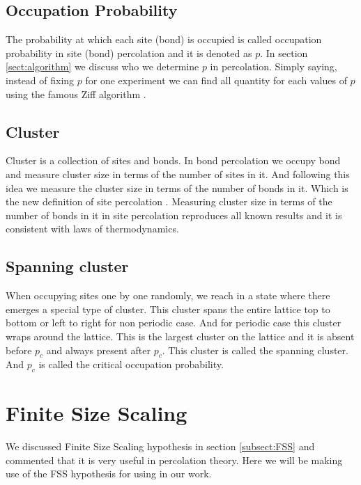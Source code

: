 	\subsection{Occupation Probability} \label{subsect:occupation-probability}
	The probability at which each site (bond) is occupied is called occupation probability in site (bond) percolation and it is denoted as $p$. In section \ref{sect:algorithm} we discuss who we determine $p$ in percolation. Simply saying, instead of fixing $p$ for one experiment we can find all quantity for each values of $p$ using the famous Ziff algorithm \cite{Newman2000, Newman2001}.
	
	\subsection{Cluster}
	Cluster is a collection of sites and bonds. In bond percolation we occupy bond and measure cluster size in terms of the number of sites in it. And following this idea we measure the cluster size in terms of the number of bonds in it. Which is the new definition of site percolation \cite{redefinition-of-site-percolation}. Measuring cluster size in terms of the number of bonds in it in site percolation reproduces all known results and it is consistent with laws of thermodynamics.
	
	\subsection{Spanning cluster}
	When occupying sites one by one randomly, we reach in a state where there emerges a special type of cluster. This cluster spans the entire lattice top to bottom or left to right for non periodic case. And for periodic case this cluster wraps around the lattice. This is the largest cluster on the lattice and it is absent before $p_c$ and always present after $p_c$. This cluster is called the spanning cluster. And $p_c$ is called the critical occupation probability.


\section{Finite Size Scaling}
	\label{sect:fss}
	We discussed Finite Size Scaling hypothesis in section \ref{subsect:FSS} and commented that it is very useful in percolation theory. Here we will be making use of the FSS hypothesis for using in our work.
	
